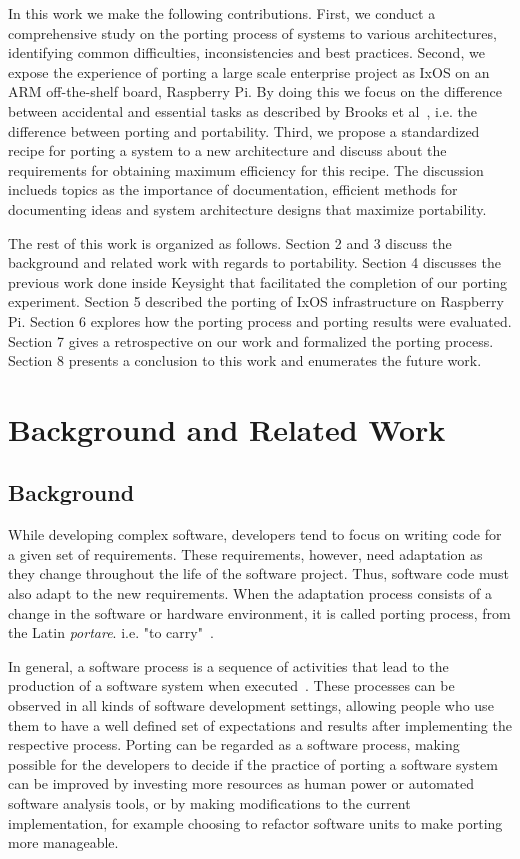 \documentclass[12pt,a4paper]{report}
\begin{document}
In this work we make the following contributions. First, we conduct a comprehensive study on the
porting process of systems to various architectures, identifying common difficulties,
inconsistencies and best practices. Second, we expose the experience of porting a large scale
enterprise project as IxOS on an ARM off-the-shelf board, Raspberry Pi. By doing this we focus on
the difference between accidental and essential tasks as described by Brooks et al~\cite{brooks1987no},
i.e. the difference between porting and portability. Third, we propose a
standardized recipe for porting a system to a new architecture and discuss about the requirements
for obtaining maximum efficiency for this recipe. The discussion inclueds topics as the
importance of documentation, efficient methods for documenting ideas and system architecture designs
that maximize portability.

The rest of this work is organized as follows. Section 2 and 3 discuss the background and related
work with regards to portability. Section 4 discusses the previous work done inside Keysight that
facilitated the completion of our porting experiment. Section 5 described the porting of IxOS
infrastructure on Raspberry Pi. Section 6 explores how the porting process and porting results were
evaluated. Section 7 gives a retrospective on our work and formalized the porting process. Section
8 presents a conclusion to this work and enumerates the future work.

\chapter{Background and Related Work}

\section{Background}

While developing complex software, developers tend to focus on writing code for a given set of
requirements. These requirements, however, need adaptation as they change throughout the life
of the software project. Thus, software code must also adapt to the new requirements. When the
adaptation process consists of a change in the software or hardware environment, it is called
porting process, from the Latin \textit{portare}. i.e. "to carry"~\cite{etymology}.

In general, a software process is a sequence of activities that lead to the production of a software system
when executed~\cite{humphrey1995discipline}. These processes can be observed in all kinds of
software development settings, allowing people who use them to have a well defined set of
expectations and results after implementing the respective process. Porting can be regarded as a
software process, making possible for the developers to decide if the practice of porting a software
system can be improved by investing more resources as human power or automated software analysis
tools, or by making modifications to the current implementation, for example choosing to refactor
software units to make porting more manageable.
\end{document}
